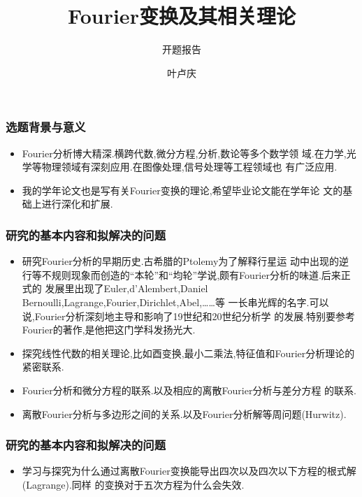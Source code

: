 \documentclass{beamer}
\begin{document}
\title{Fourier变换及其相关理论} \subtitle{开题报告}
\author{叶卢庆}
\begin{frame}
  \titlepage
\end{frame}
\begin{frame}
  \frametitle{选题背景与意义}
  \begin{itemize}
  \item Fourier分析博大精深.横跨代数,微分方程,分析,数论等多个数学领
    域.在力学,光学等物理领域有深刻应用.在图像处理,信号处理等工程领域也
    有广泛应用.\pause
  \item 我的学年论文也是写有关Fourier变换的理论,希望毕业论文能在学年论
    文的基础上进行深化和扩展.
  \end{itemize}
\end{frame}
\begin{frame}
  \frametitle{研究的基本内容和拟解决的问题}
  \begin{itemize}
\item 研究Fourier分析的早期历史.古希腊的Ptolemy为了解释行星运
  动中出现的逆行等不规则现象而创造的“本轮”和“均轮”学说,颇有Fourier分析的味道.后来正式的
  发展里出现了Euler,d'Alembert,Daniel Bernoulli,Lagrange,Fourier,Dirichlet,Abel,……等
  一长串光辉的名字.可以说,Fourier分析深刻地主导和影响了19世纪和20世纪分析学
  的发展.特别要参考Fourier的著作,是他把这门学科发扬光大.\pause
\item 探究线性代数的相关理论,比如酉变换,最小二乘法,特征值和Fourier分析理论的
  紧密联系.\pause
\item Fourier分析和微分方程的联系.以及相应的离散Fourier分析与差分方程
  的联系.\pause
\item 离散Fourier分析与多边形之间的关系.以及Fourier分析解等周问题(Hurwitz).
  \end{itemize}
\end{frame}
\begin{frame}
  \frametitle{研究的基本内容和拟解决的问题}
\begin{itemize}
  \item 学习与探究为什么通过离散Fourier变换能导出四次以及四次以下方程的根式解(Lagrange).同样
  的变换对于五次方程为什么会失效.
\end{itemize}
\end{frame}
\end{document}
